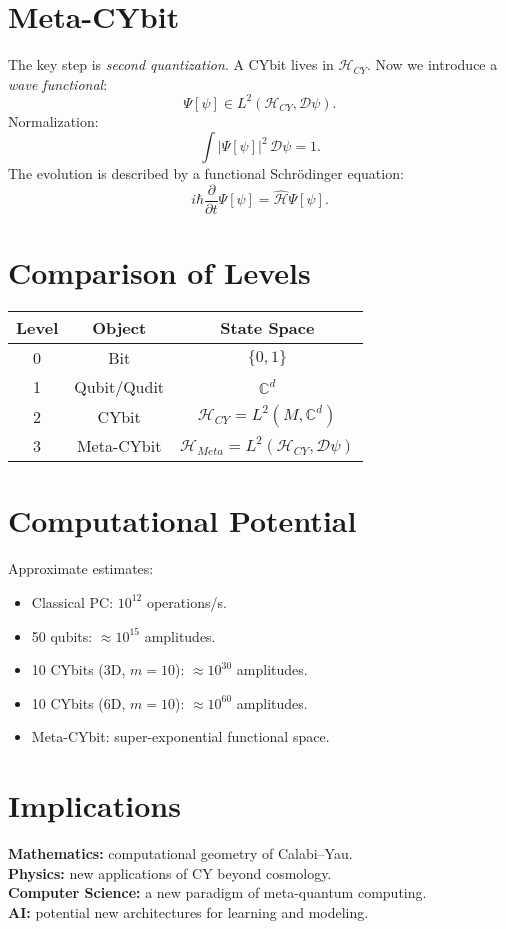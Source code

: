 \documentclass[12pt,a4paper]{article}
\begin{document}
\section{Meta-CYbit}
The key step is \emph{second quantization}.
A CYbit lives in $\mathcal{H}_{CY}$.
Now we introduce a \emph{wave functional}:
\[
\Psi[\psi] \in L^2(\mathcal{H}_{CY},\mathcal{D}\psi).
\]
Normalization:
\[
\int |\Psi[\psi]|^2 \,\mathcal{D}\psi = 1.
\]
The evolution is described by a functional Schrödinger equation:
\[
i\hbar \frac{\partial}{\partial t} \Psi[\psi] 
= \hat{\mathcal{H}} \Psi[\psi].
\]

\section{Comparison of Levels}
\begin{tabular}{|c|c|c|}
\hline
Level & Object & State Space \\
\hline
0 & Bit & $\{0,1\}$ \\
1 & Qubit/Qudit & $\mathbb{C}^d$ \\
2 & CYbit & $\mathcal{H}_{CY} = L^2(M,\mathbb{C}^d)$ \\
3 & Meta-CYbit & $\mathcal{H}_{Meta} = L^2(\mathcal{H}_{CY},\mathcal{D}\psi)$ \\
\hline
\end{tabular}

\section{Computational Potential}
Approximate estimates:
\begin{itemize}
\item Classical PC: $10^{12}$ operations/s.
\item 50 qubits: $\approx 10^{15}$ amplitudes.
\item 10 CYbits (3D, $m=10$): $\approx 10^{30}$ amplitudes.
\item 10 CYbits (6D, $m=10$): $\approx 10^{60}$ amplitudes.
\item Meta-CYbit: super-exponential functional space.
\end{itemize}

\section{Implications}
\textbf{Mathematics:} computational geometry of Calabi--Yau. \\
\textbf{Physics:} new applications of CY beyond cosmology. \\
\textbf{Computer Science:} a new paradigm of meta-quantum computing. \\
\textbf{AI:} potential new architectures for learning and modeling.
\end{document}
